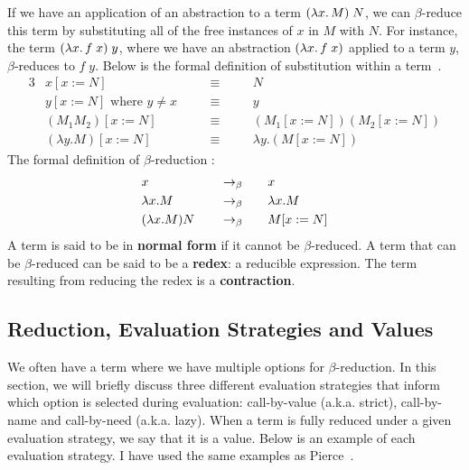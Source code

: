 \noindent 
If we have an application of an abstraction to a term $(\lambda x.\, M)\;N$, we can $\beta$-reduce this term by substituting all of the free instances of $x$ in $M$ with $N$. For instance, the term $(\lambda x.\, f\;x)\; y$, where we have an abstraction $(\lambda x.\, f\;x)$ applied to a term $y$, $\beta$-reduces to $f\;y$. Below is the formal definition of substitution within a term~\cite{barendregt2013lambda}. 
\noindent\begin{alignat*}{3}
&x[x:=N]                        \quad && \equiv \quad && N                       \\
&y[x:=N] \text{ where } y \ne x \quad && \equiv \quad && y                       \\
&(M_1 M_2)[x:=N]                \quad && \equiv \quad && (M_1[x:=N]) (M_2[x:=N]) \\
&(\lambda y.M)[x:=N]            \quad && \equiv \quad && \lambda y.(M[x:=N])     
\end{alignat*}  
\noindent The formal definition of $\beta$-reduction \cite{barendregt2013lambda}:
\begin{alignat*}{3}
&x                 \quad && \rightarrow_\beta \quad &&        x           \\
&\lambda x.M       \quad && \rightarrow_\beta \quad &&        \lambda x.M \\
&(\lambda x.M) N   \quad && \rightarrow_\beta \quad &&        M[x:=N]
\end{alignat*}
A term is said to be in \textbf{normal form} if it cannot be $\beta$-reduced. A term that can be $\beta$-reduced can be said to be a \textbf{redex}: a reducible expression. The term resulting from reducing the redex is a \textbf{contraction}.

\subsection{Reduction, Evaluation Strategies and Values}
\label{bg:eval_strategies}
We often have a term where we have multiple options for $\beta$-reduction. In this section, we will briefly discuss three different evaluation strategies that inform which option is selected during evaluation: call-by-value (a.k.a. strict), call-by-name and call-by-need (a.k.a. lazy). When a term is fully reduced under a given evaluation strategy, we say that it is a value. Below is an example of each evaluation strategy. I have used the same examples as Pierce~\cite{pierce2002types}. 

